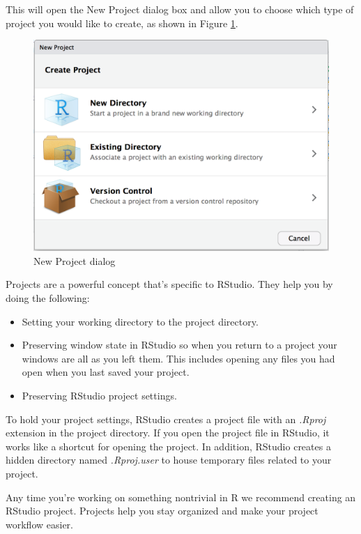 \documentclass[
]{book}
\providecommand{\tightlist}{%
  \setlength{\itemsep}{0pt}\setlength{\parskip}{0pt}}
\begin{document}
This will open the New Project dialog box and allow you to choose which type of project you would like to create, as shown in Figure \ref{fig:filenewmenu}.

\begin{figure}
\includegraphics[width=14.92in]{images/chapter-3/rstudio.newproject.dialog} \caption{New Project dialog}\label{fig:filenewmenu}
\end{figure}

Projects are a powerful concept that's specific to RStudio. They help you by doing the following:

\begin{itemize}
\tightlist
\item
  Setting your working directory to the project directory.
\item
  Preserving window state in RStudio so when you return to a project your windows are all as you left them. This includes opening any files you had open when you last saved your project.
\item
  Preserving RStudio project settings.
\end{itemize}

To hold your project settings, RStudio creates a project file with an \emph{.Rproj} extension in the project directory. If you open the project file in RStudio, it works like a shortcut for opening the project. In addition, RStudio creates a hidden directory named \emph{.Rproj.user} to house temporary files related to your project.

Any time you're working on something nontrivial in R we recommend creating an RStudio project. Projects help you stay organized and make your project workflow easier.
\end{document}
